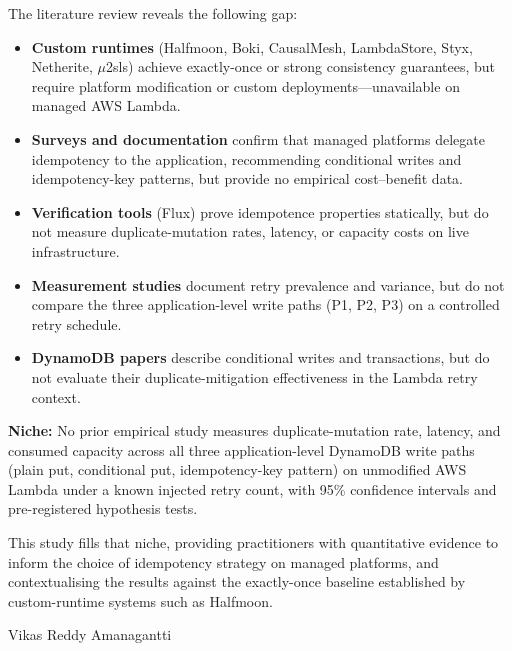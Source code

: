 The literature review reveals the following gap:

\begin{itemize}
    \item \textbf{Custom runtimes} (Halfmoon, Boki, CausalMesh, LambdaStore, Styx, Netherite, $\mu$2sls) achieve exactly-once or strong consistency guarantees, but require platform modification or custom deployments---unavailable on managed AWS Lambda.
    \item \textbf{Surveys and documentation} \citep{Shafiei2022Survey, Wen2023RiseServerless, AWSLambdaDocs} confirm that managed platforms delegate idempotency to the application, recommending conditional writes and idempotency-key patterns, but provide no empirical cost--benefit data.
    \item \textbf{Verification tools} (Flux) prove idempotence properties statically, but do not measure duplicate-mutation rates, latency, or capacity costs on live infrastructure.
    \item \textbf{Measurement studies} \citep{Wen2025Variance, Xie2025Faults, Joosen2023Production} document retry prevalence and variance, but do not compare the three application-level write paths (P1, P2, P3) on a controlled retry schedule.
    \item \textbf{DynamoDB papers} \citep{Elhemali2022DynamoDB, Idziorek2023DynamoDBTx} describe conditional writes and transactions, but do not evaluate their duplicate-mitigation effectiveness in the Lambda retry context.
\end{itemize}

\textbf{Niche:} No prior empirical study measures duplicate-mutation rate, latency, and consumed capacity across all three application-level DynamoDB write paths (plain put, conditional put, idempotency-key pattern) on unmodified AWS Lambda under a known injected retry count, with 95\% confidence intervals and pre-registered hypothesis tests.

This study fills that niche, providing practitioners with quantitative evidence to inform the choice of idempotency strategy on managed platforms, and contextualising the results against the exactly-once baseline established by custom-runtime systems such as Halfmoon.

Vikas Reddy Amanagantti
